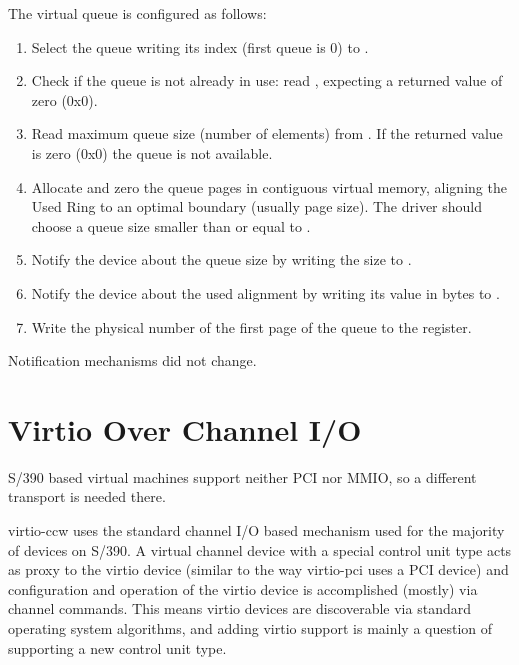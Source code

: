The virtual queue is configured as follows:
\begin{enumerate}
\item Select the queue writing its index (first queue is 0) to
   .

\item Check if the queue is not already in use: read ,
   expecting a returned value of zero (0x0).

\item Read maximum queue size (number of elements) from
   . If the returned value is zero (0x0) the
   queue is not available.

\item Allocate and zero the queue pages in contiguous virtual
   memory, aligning the Used Ring to an optimal boundary (usually
   page size). The driver should choose a queue size smaller than or
   equal to .

\item Notify the device about the queue size by writing the size to
   .

\item Notify the device about the used alignment by writing its value
   in bytes to .

\item Write the physical number of the first page of the queue to
   the  register.
\end{enumerate}

Notification mechanisms did not change.

\section{Virtio Over Channel I/O}\label{sec:Virtio Transport Options / Virtio Over Channel I/O}

S/390 based virtual machines support neither PCI nor MMIO, so a
different transport is needed there.

virtio-ccw uses the standard channel I/O based mechanism used for
the majority of devices on S/390. A virtual channel device with a
special control unit type acts as proxy to the virtio device
(similar to the way virtio-pci uses a PCI device) and
configuration and operation of the virtio device is accomplished
(mostly) via channel commands. This means virtio devices are
discoverable via standard operating system algorithms, and adding
virtio support is mainly a question of supporting a new control
unit type.

